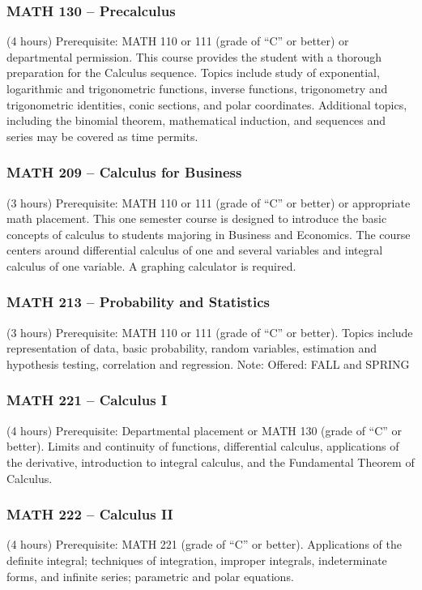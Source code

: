 \subsubsection{MATH 130 -- Precalculus}
(4 hours) Prerequisite: MATH 110 or 111 (grade of “C” or better) or departmental permission. This course provides the student with a thorough preparation for the Calculus sequence. Topics include study of exponential, logarithmic and trigonometric functions, inverse functions, trigonometry and trigonometric identities, conic sections, and polar coordinates. Additional topics, including the binomial theorem, mathematical induction, and sequences and series may be covered as time permits.

\subsubsection{MATH 209 -- Calculus for Business}
(3 hours) Prerequisite: MATH 110 or 111 (grade of “C” or better) or appropriate math placement. This one semester course is designed to introduce the basic concepts of calculus to students majoring in Business and Economics. The course centers around differential calculus of one and several variables and integral calculus of one variable. A graphing calculator is required.

\subsubsection{MATH 213 -- Probability and Statistics}
(3 hours) Prerequisite: MATH 110 or 111 (grade of “C” or better). Topics include representation of data, basic probability, random variables, estimation and hypothesis testing, correlation and regression. Note: Offered: FALL and SPRING

\subsubsection{MATH 221 -- Calculus I}
(4 hours) Prerequisite: Departmental placement or MATH 130 (grade of “C” or better). Limits and continuity of functions, differential calculus, applications of the derivative, introduction to integral calculus, and the Fundamental Theorem of Calculus.

\subsubsection{MATH 222 -- Calculus II}
(4 hours) Prerequisite: MATH 221 (grade of “C” or better). Applications of the definite integral; techniques of integration, improper integrals, indeterminate forms, and infinite series; parametric and polar equations.

